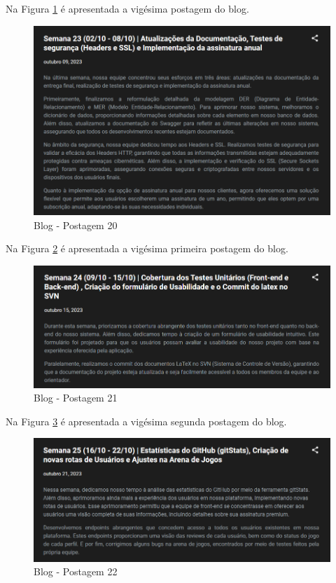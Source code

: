 \begin{apendicesenv}
Na Figura \ref{fig:128} é apresentada a vigésima postagem do blog.

\begin{figure}[H]
	\centering
	\includegraphics[scale=0.68]{./imagens/Blog20.png}
	\caption{Blog - Postagem 20}
    \label{fig:128}
\end{figure}
\pagebreak

Na Figura \ref{fig:129} é apresentada a vigésima primeira postagem do blog.

\begin{figure}[H]
	\centering
	\includegraphics[scale=0.68]{./imagens/Blog21.png}
	\caption{Blog - Postagem 21}
    \label{fig:129}
\end{figure}


Na Figura \ref{fig:130} é apresentada a vigésima segunda postagem do blog.

\begin{figure}[H]
	\centering
	\includegraphics[scale=0.68]{./imagens/Blog22.png}
	\caption{Blog - Postagem 22}
    \label{fig:130}
\end{figure}
\pagebreak


\end{apendicesenv}

